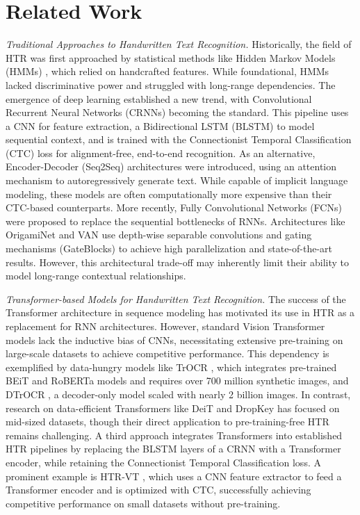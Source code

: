 \documentclass[final,5p,times]{elsarticle}
\begin{document}
\section{Related Work}
\textit{Traditional Approaches to Handwritten Text Recognition.} Historically, the field of HTR was first approached by statistical methods like Hidden Markov Models (HMMs) \cite{plotz2009, elyacoubi1999}, which relied on handcrafted features. While foundational, HMMs lacked discriminative power and struggled with long-range dependencies. The emergence of deep learning established a new trend, with Convolutional Recurrent Neural Networks (CRNNs) \cite{puigcerver2017, cojocaru2021, bluche2017gated} becoming the standard. This pipeline uses a CNN for feature extraction, a Bidirectional LSTM (BLSTM) \cite{graves2005} to model sequential context, and is trained with the Connectionist Temporal Classification (CTC) loss \cite{graves2006} for alignment-free, end-to-end recognition.
As an alternative, Encoder-Decoder (Seq2Seq) architectures \cite{michael2019, bluche2017scan, doetsch2016} were introduced, using an attention mechanism \cite{bahdanau2015} to autoregressively generate text. While capable of implicit language modeling, these models are often computationally more expensive than their CTC-based counterparts. More recently, Fully Convolutional Networks (FCNs) \cite{coquenet2022van, yousef2020origami, coquenet2020fcn} were proposed to replace the sequential bottlenecks of RNNs. Architectures like OrigamiNet \cite{yousef2020origami} and VAN \cite{coquenet2022van} use depth-wise separable convolutions \cite{chollet2017} and gating mechanisms (GateBlocks) \cite{yousef2020gateblocks} to achieve high parallelization and state-of-the-art results. However, this architectural trade-off may inherently limit their ability to model long-range contextual relationships.

\textit{Transformer-based Models for Handwritten Text Recognition.} The success of the Transformer architecture \cite{vaswani2017} in sequence modeling has motivated its use in HTR as a replacement for RNN architectures. However, standard Vision Transformer models \cite{dosovitskiy2020} lack the inductive bias of CNNs, necessitating extensive pre-training on large-scale datasets \cite{li2023trocr, fujitake2023dtrocr} to achieve competitive performance. This dependency is exemplified by data-hungry models like TrOCR \cite{li2023trocr}, which integrates pre-trained BEiT \cite{bao2021beit} and RoBERTa \cite{liu2019roberta} models and requires over 700 million synthetic images, and DTrOCR \cite{fujitake2023dtrocr}, a decoder-only model scaled with nearly 2 billion images. In contrast, research on data-efficient Transformers like DeiT \cite{touvron2021deit} and DropKey \cite{li2023dropkey} has focused on mid-sized datasets, though their direct application to pre-training-free HTR remains challenging. A third approach integrates Transformers into established HTR pipelines by replacing the BLSTM layers of a CRNN with a Transformer encoder, while retaining the Connectionist Temporal Classification loss. A prominent example is HTR-VT \cite{li2024htrvt}, which uses a CNN feature extractor to feed a Transformer encoder and is optimized with CTC, successfully achieving competitive performance on small datasets without pre-training.
\end{document}
